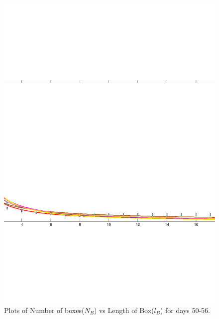 \documentclass{article}
\begin{document}
\begin{figure}
\centering
\includegraphics[scale=0.3]{plot8/plot8}
\caption{Plots of Number of boxes($N_B$) vs Length of Box($l_B$) for days 50-56.}
\end{figure}
\end{document}
